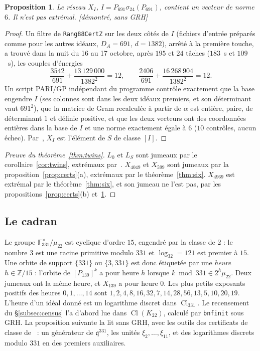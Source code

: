 \documentclass[11pt,a4paper]{amsart}
\theoremstyle{plain}
\newtheorem{proposition}{Proposition}[section]
\theoremstyle{definition}
\newcommand{\Z}{\mathbb{Z}}
\newcommand{\F}{\mathbb{F}}
\newcommand{\q}{\mathfrak{q}}
\DeclareMathOperator{\Cl}{Cl}
\newcommand{\Lz}{L_{0}}
\newcommand{\LS}{L_{S}}
\newcommand{\st}[1]{\textup{\textsf{\small[#1]}}}
\begin{document}
\begin{proposition}\label{prop:temoin}
Le réseau $X_I$, $I=P_{691}\sigma_{24}(P_{691})$, contient un vecteur de norme $6$. Il n'est pas extrémal. \st{démontré, sans GRH}
\end{proposition}

\begin{proof}
Un filtre de \texttt{Rang88CertZ} sur les deux côtés de $I$ (fichiers d'entrée préparés comme pour les autres idéaux, $D_A=691$, $d=1382$), arrêté à la première touche, a trouvé dans la nuit du 16 au 17 octobre, après $195$ et $24$ tâches ($183$~s et $109$~s), les couples d'énergies
\[
\frac{3542}{691}+\frac{13\,129\,000}{1382^2}=12,\qquad \frac{2406}{691}+\frac{16\,268\,904}{1382^2}=12 .
\]
Un script PARI/GP indépendant du programme contrôle exactement que la base engendre $I$ (ses colonnes sont dans les deux idéaux premiers, et son déterminant vaut $691^2$), que la matrice de Gram recalculée à partir de $\alpha$ est entière, paire, de déterminant $1$ et définie positive, et que les deux vecteurs ont des coordonnées entières dans la base de $I$ et une norme exactement égale à $6$ ($10$ contrôles, aucun échec). Par~\cite[prop.~2.3(b)]{Gau26}, $X_I$ est l'élément de $S$ de classe $[I]$.
\end{proof}

\begin{proof}[Preuve du théorème~\ref{thm:twins}]
$\Lz$ et $\LS$ sont jumeaux par le corollaire~\ref{cor:twins}, extrémaux par~\cite{Sak26}. $X_{4049}$ et $X_{599}$ sont jumeaux par la proposition~\ref{prop:certs}(a), extrémaux par le théorème~\ref{thm:six}. $X_{4969}$ est extrémal par le théorème~\ref{thm:six}, et son jumeau ne l'est pas, par les propositions~\ref{prop:certs}(b) et~\ref{prop:temoin}.
\end{proof}

\subsection{Le cadran}\label{subsec:dial}
Le groupe $\F_{331}^\times/\mu_{22}$ est cyclique d'ordre $15$, engendré par la classe de $2$ : le nombre $3$ est une racine primitive modulo $331$ et $\log_32=121$ est premier à $15$. Une orbite de support $\{331\}$ ou $\{3,331\}$ est donc étiquetée par une \emph{heure} $h\in\Z/15$ : l'orbite de $[P_{139}]^k$ a pour heure $h$ lorsque $k\bmod331\in2^h\mu_{22}$. Deux jumeaux ont la même heure, et $X_{139}$ a pour heure $0$. Les plus petits exposants positifs des heures $0,1,\dots,14$ sont $1,2,4,8,16,32,7,14,28,56,13,5,10,20,19$. L'heure d'un idéal donné est un logarithme discret dans $\Cl_{331}$. Le recensement du \S\ref{subsec:census} l'a d'abord lue dans $\Cl(K_{22})$, calculé par \texttt{bnfinit} sous GRH. La proposition suivante la lit sans GRH, avec les outils des certificats de classe de~\cite[\S6.4]{Gau26} : un générateur de $\q^{331}$, les unités $\xi_2,\dots,\xi_{11}$, et des logarithmes discrets modulo $331$ en des premiers auxiliaires.
\end{document}
